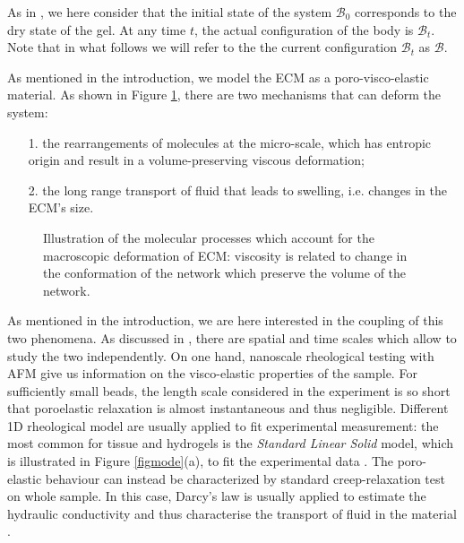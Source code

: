 \documentclass[runningheads]{llncs}
\begin{document}
As in \cite{sarah}, we here consider that the initial state of the system $\mathcal{B}_0$ corresponds to the dry state of the gel. At any time $t$, the actual configuration of the body is $\mathcal{B}_t$. Note that in what follows we will refer to the the current configuration $\mathcal{B}_t$ as $\mathcal{B}$. 

As mentioned in the introduction, we model the ECM as a poro-visco-elastic material. As shown in Figure \ref{deformation}, there are two mechanisms that can deform the system: 
\begin{itemize}
	\item [1.] the rearrangements of molecules at the micro-scale,  which has entropic origin and result in a volume-preserving viscous deformation;
	\item[2.] the long range transport of fluid that leads to swelling, i.e. changes in the ECM's size. 
\end{itemize}

\begin{figure}[h!]
	\hspace{-10mm}
	\def\svgwidth{1.2\linewidth}
	
	\caption{Illustration of the molecular processes which account for the macroscopic deformation of ECM: viscosity is related to change in the conformation of the network which preserve the volume of the network.}
	\label{deformation}
\end{figure}
 
As mentioned in the introduction, we are here interested in the coupling of this two phenomena. As discussed in \cite{viscoporo}, there are spatial and time scales which allow to study the two independently. On one hand, nanoscale rheological testing with AFM give us information on the visco-elastic properties of the sample. For sufficiently small beads, the length scale considered in the experiment is so short that poroelastic relaxation is almost instantaneous and thus negligible. Different 1D rheological model are usually applied to fit experimental measurement: the most common for tissue and hydrogels is the \textit{Standard Linear Solid} model, which is illustrated in Figure \ref{figmode}(a), to fit the experimental data \cite{Article1,viscoporo}. The poro-elastic behaviour can instead be characterized by standard creep-relaxation test on whole sample. In this case, Darcy's law is usually applied to estimate the hydraulic conductivity and thus characterise the transport of fluid in the material \cite{Netti,viscoporo}. 
\end{document}
